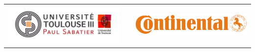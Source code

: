\begin{titlepage}
\BgThispage
{}
\begin{tabular}{cp{2.8cm}c}
	\begin{minipage}{0.4\textwidth}
		\vspace{-40px}
		\hspace{-35px}
		\includegraphics[width=8cm]{images/logos/ups.jpg}
	\end{minipage}
	&
	&
	\begin{minipage}{0.4\textwidth}
		\vspace{-40px}
		\includegraphics[width=8cm]{images/logos/conti.png}
	\end{minipage}
	\\
\end{tabular}


\end{titlepage}
